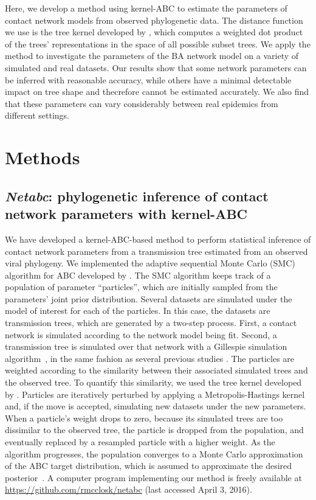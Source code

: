\documentclass[12pt]{article}\usepackage[]{graphicx}\usepackage[]{color}
\begin{document}
Here, we develop a method using kernel-ABC to estimate the parameters of
contact network models from observed phylogenetic data. The distance function
we use is the tree kernel developed by \textcite{poon2013mapping}, which computes
a weighted dot product of the trees' representations in the space of all
possible subset trees. We apply the method to investigate the parameters of the
BA network model on a variety of simulated and real datasets. Our results show
that some network parameters can be inferred with reasonable accuracy, while
others have a minimal detectable impact on tree shape and thecrefore cannot be
estimated accurately. We also find that these parameters can vary considerably
between real epidemics from different settings.

\section{Methods}

\subsection{\textit{Netabc}: phylogenetic inference of contact network
parameters with kernel-ABC}

We have developed a kernel-ABC-based method to perform statistical inference of
contact network parameters from a transmission tree estimated from an observed
viral phylogeny. We implemented the adaptive sequential Monte Carlo (SMC)
algorithm for ABC developed by \textcite{del2012adaptive}. The SMC algorithm
keeps track of a population of parameter ``particles'', which are initially
sampled from the parameters' joint prior distribution. Several datasets are
simulated under the model of interest for each of the particles. In this case,
the datasets are transmission trees, which are generated by a two-step process.
First, a contact network is simulated according to the network model being fit.
Second, a transmission tree is simulated over that network with a Gillespie
simulation algorithm~\autocite{gillespie1976general}, in the same fashion as
several previous studies \autocite[\textit{e.g.}][]{robinson2013dynamics,
leventhal2012inferring}. The particles are weighted according to the similarity
between their associated simulated trees and the observed tree. To quantify
this similarity, we used the tree kernel developed by
\textcite{poon2013mapping}. Particles are iteratively perturbed by applying a
Metropolis-Hastings kernel and, if the move is accepted, simulating new
datasets under the new parameters. When a particle's weight drops to zero,
because its simulated trees are too dissimilar to the observed tree, the
particle is dropped from the population, and eventually replaced by a resampled
particle with a higher weight. As the algorithm progresses, the population
converges to a Monte Carlo approximation of the ABC target distribution, which
is assumed to approximate the desired posterior~\autocite{del2012adaptive,
sunnaaker2013approximate}. A computer program implementing our method is freely
available at \url{https://github.com/rmcclosk/netabc} (last accessed April 3,
2016).
\end{document}
